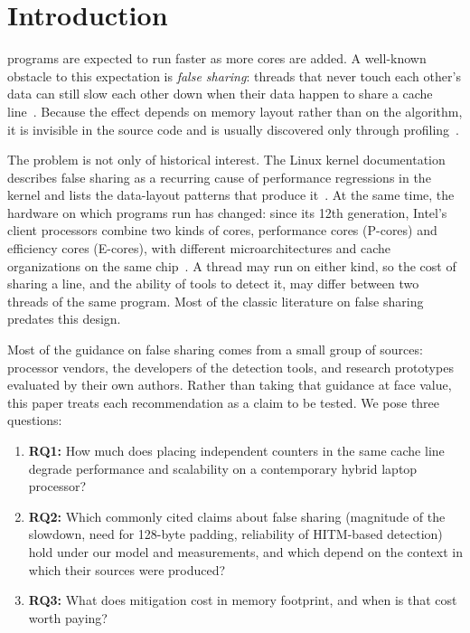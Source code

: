 \documentclass[journal]{IEEEtran}
\begin{document}
\section{Introduction}
\label{sec:intro}

 programs are expected to run faster as more cores are
added. A well-known obstacle to this expectation is \emph{false sharing}: threads
that never touch each other's data can still slow each other down when their
data happen to share a cache line~\cite{torrellas1994false,tang2023kernel}.
Because the effect depends on memory layout rather than on the algorithm, it is
invisible in the source code and is usually discovered only through
profiling~\cite{mario2016c2c,liu2011sheriff}.

The problem is not only of historical interest. The Linux kernel documentation
describes false sharing as a recurring cause of performance regressions in the
kernel and lists the data-layout patterns that produce
it~\cite{tang2023kernel}. At the same time, the hardware on which programs run
has changed: since its 12th generation, Intel's client processors combine two
kinds of cores, performance cores (P-cores) and efficiency cores (E-cores),
with different microarchitectures and cache organizations on the same
chip~\cite{intel2024opt}. A thread may run on either kind, so the cost of
sharing a line, and the ability of tools to detect it, may differ between two
threads of the same program. Most of the classic literature on false sharing
predates this design.

Most of the guidance on false sharing comes from a small group of sources:
processor vendors, the developers of the detection tools, and research
prototypes evaluated by their own authors. Rather than taking that guidance at
face value, this paper treats each recommendation as a claim to be tested. We
pose three questions:
\begin{enumerate}
  \item \textbf{RQ1:} How much does placing independent counters in the same
        cache line degrade performance and scalability on a contemporary
        hybrid laptop processor?
  \item \textbf{RQ2:} Which commonly cited claims about false sharing
        (magnitude of the slowdown, need for 128-byte padding, reliability of
        HITM-based detection) hold under our model and measurements, and which
        depend on the context in which their sources were produced?
  \item \textbf{RQ3:} What does mitigation cost in memory footprint, and when
        is that cost worth paying?
\end{enumerate}
\end{document}
